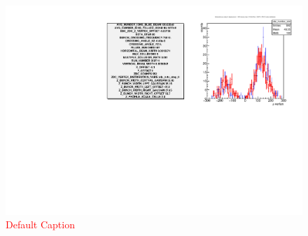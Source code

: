 \begin{figure}
\begin{center}
\includegraphics[width=\linewidth,height=\textheight,keepaspectratio]{../HourglassCorrection/figs/zvertex_compare_hscan_pos_1000_359711}
\caption{ \textcolor{red}{Default Caption} }
\label{fig:zvertex_compare_hscan_pos_1000_359711}
\end{center}
\end{figure}